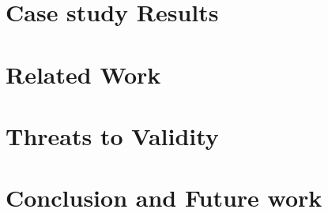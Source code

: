 \documentclass[10pt, conference]{IEEEtran}
\begin{document}
\section{Case study Results}
\label{sec:case_study_results}


\section{Related Work}
\label{sec:related_work}



\section{Threats to Validity}
\label{sec:threats_to_validity}


\section{Conclusion and Future work}
\label{sec:conclusion}



\balance
  
\end{document}
